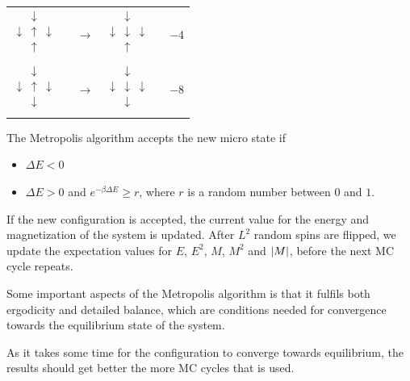 \documentclass[%
 reprint,
nofootinbib,
aps,
]{revtex4-1}
\begin{document}
\begin{table}[]
\begin{tabular}{@{}ccc|c@{}}
$\begin{matrix}& \downarrow & \\ \downarrow & \uparrow & \downarrow \\ & \uparrow & \\ & & & \end{matrix}$ & $\boldsymbol{\rightarrow}$ & $\begin{matrix}& \downarrow & \\ \downarrow & \downarrow & \downarrow \\ & \uparrow & \\ & & & \end{matrix}$ & $-4$ \\
$\begin{matrix}& \downarrow & \\ \downarrow & \uparrow & \downarrow \\ & \downarrow & \\ & & & \end{matrix}$ & $\boldsymbol{\rightarrow}$ & $\begin{matrix}& \downarrow & \\ \downarrow & \downarrow & \downarrow \\ & \downarrow & \\ & & & \end{matrix}$ & $-8$ \\ \bottomrule
\end{tabular}
\end{table}

The Metropolis algorithm accepts the new micro state if 
\begin{itemize}
\item $\Delta E < 0$
\item $\Delta E > 0$ and $e^{-\beta \Delta E} \geq r$, where $r$ is a random number between $0$ and $1$.
\end{itemize}


If the new configuration is accepted, the current value for the energy and magnetization of the system is updated. After $L^2$ random spins are flipped, we update the expectation values for $E$, $E^2$, $M$, $M^2$ and $\abs{M}$, before the next MC cycle repeats.

Some important aspects of the Metropolis algorithm is that it fulfils both ergodicity and detailed balance, which are conditions needed for convergence towards the equilibrium state of the system.



As it takes some time for the configuration to converge towards equilibrium, the results should get better the more MC cycles that is used.
\end{document}

